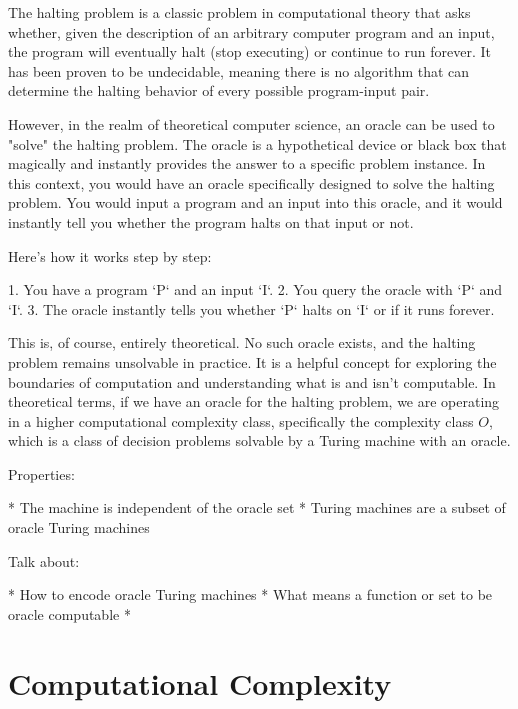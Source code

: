 \begin{example}
The halting problem is a classic problem in computational theory that asks whether, given the description of an arbitrary computer program and an input, the program will eventually halt (stop executing) or continue to run forever. It has been proven to be undecidable, meaning there is no algorithm that can determine the halting behavior of every possible program-input pair.

However, in the realm of theoretical computer science, an oracle can be used to "solve" the halting problem. The oracle is a hypothetical device or black box that magically and instantly provides the answer to a specific problem instance. In this context, you would have an oracle specifically designed to solve the halting problem. You would input a program and an input into this oracle, and it would instantly tell you whether the program halts on that input or not.

Here's how it works step by step:

1. You have a program `P` and an input `I`.
2. You query the oracle with `P` and `I`.
3. The oracle instantly tells you whether `P` halts on `I` or if it runs forever.

This is, of course, entirely theoretical. No such oracle exists, and the halting problem remains unsolvable in practice. It is a helpful concept for exploring the boundaries of computation and understanding what is and isn’t computable. In theoretical terms, if we have an oracle for the halting problem, we are operating in a higher computational complexity class, specifically the complexity class \(O\), which is a class of decision problems solvable by a Turing machine with an oracle.
\end{example}


Properties:

 * The machine is independent of the oracle set
 * Turing machines are a subset of oracle Turing machines

Talk about:

 * How to encode oracle Turing machines
 * What means a function or set to be oracle computable
 * 

%
%

\section{Computational Complexity}
\label{sec:computational_complexity}

